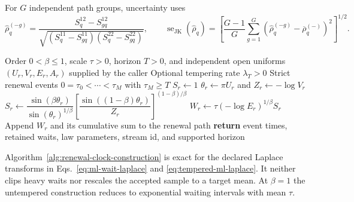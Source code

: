 For $G$ independent path groups, uncertainty uses
\begin{equation}
\widehat\rho_q^{(-g)}=
\frac{S_q^{12}-S_{gq}^{12}}
{\sqrt{(S_q^{11}-S_{gq}^{11})(S_q^{22}-S_{gq}^{22})}},
\qquad
\operatorname{se}_{\mathrm{JK}}(\widehat\rho_q)=
\left[\frac{G-1}{G}\sum_{g=1}^{G}
\left(\widehat\rho_q^{(-g)}-\overline\rho_q^{(-)}\right)^2\right]^{1/2}.
\end{equation}

\begin{algorithm}[H]
\caption{Mittag--Leffler and exponentially tempered renewal paths}
\label{alg:renewal-clock-construction}
\begin{algorithmic}[1]
\Require Order $0<\beta\leq1$, scale $\tau>0$, horizon $T>0$, and independent
open uniforms $(U_r,V_r,E_r,A_r)$ supplied by the caller
\Require Optional tempering rate $\lambda_T>0$
\Ensure Strict renewal events $0=\tau_0<\cdots<\tau_M$ with $\tau_M\geq T$
    \State $S_r\gets1$
  \Else
    \State $\theta_r\gets\pi U_r$ and $Z_r\gets-\log V_r$
    \State $S_r\gets
    \dfrac{\sin(\beta\theta_r)}{\sin(\theta_r)^{1/\beta}}
    \left[\dfrac{\sin((1-\beta)\theta_r)}{Z_r}\right]^{(1-\beta)/\beta}$
  \EndIf
  \State $W_r\gets\tau(-\log E_r)^{1/\beta}S_r$
    \State Append $W_r$ and its cumulative sum to the renewal path
  \EndIf
\EndFor
\State \textbf{return} event times, retained waits, law parameters, stream id,
and supported horizon
\end{algorithmic}
\end{algorithm}

Algorithm~\ref{alg:renewal-clock-construction} is exact for the declared
Laplace transforms in Eqs.~\eqref{eq:ml-wait-laplace} and
\eqref{eq:tempered-ml-laplace}.  It neither clips heavy waits nor rescales the
accepted sample to a target mean.  At $\beta=1$ the untempered construction
reduces to exponential waiting intervals with mean $\tau$.

